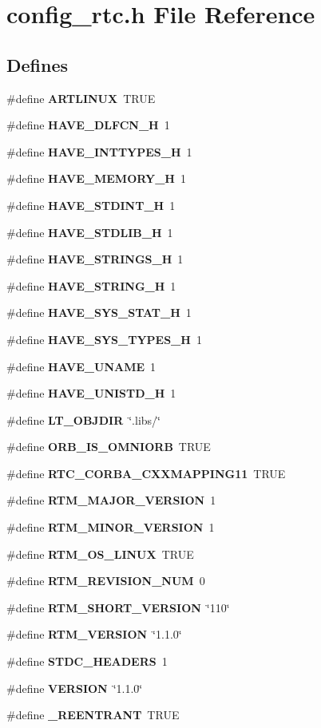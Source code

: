 \section{config\_\-rtc.h File Reference}
\label{config__rtc_8h}
\subsection*{Defines}
\begin{DoxyCompactItemize}
\item 
\#define {\bf ARTLINUX}~TRUE
\item 
\#define {\bf HAVE\_\-DLFCN\_\-H}~1
\item 
\#define {\bf HAVE\_\-INTTYPES\_\-H}~1
\item 
\#define {\bf HAVE\_\-MEMORY\_\-H}~1
\item 
\#define {\bf HAVE\_\-STDINT\_\-H}~1
\item 
\#define {\bf HAVE\_\-STDLIB\_\-H}~1
\item 
\#define {\bf HAVE\_\-STRINGS\_\-H}~1
\item 
\#define {\bf HAVE\_\-STRING\_\-H}~1
\item 
\#define {\bf HAVE\_\-SYS\_\-STAT\_\-H}~1
\item 
\#define {\bf HAVE\_\-SYS\_\-TYPES\_\-H}~1
\item 
\#define {\bf HAVE\_\-UNAME}~1
\item 
\#define {\bf HAVE\_\-UNISTD\_\-H}~1
\item 
\#define {\bf LT\_\-OBJDIR}~\char`\"{}.libs/\char`\"{}
\item 
\#define {\bf ORB\_\-IS\_\-OMNIORB}~TRUE
\item 
\#define {\bf RTC\_\-CORBA\_\-CXXMAPPING11}~TRUE
\item 
\#define {\bf RTM\_\-MAJOR\_\-VERSION}~1
\item 
\#define {\bf RTM\_\-MINOR\_\-VERSION}~1
\item 
\#define {\bf RTM\_\-OS\_\-LINUX}~TRUE
\item 
\#define {\bf RTM\_\-REVISION\_\-NUM}~0
\item 
\#define {\bf RTM\_\-SHORT\_\-VERSION}~\char`\"{}110\char`\"{}
\item 
\#define {\bf RTM\_\-VERSION}~\char`\"{}1.1.0\char`\"{}
\item 
\#define {\bf STDC\_\-HEADERS}~1
\item 
\#define {\bf VERSION}~\char`\"{}1.1.0\char`\"{}
\item 
\#define {\bf \_\-REENTRANT}~TRUE
\end{DoxyCompactItemize}



